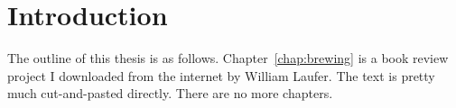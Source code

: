 %
%

\chapter{Introduction}

The outline of this thesis is as follows. Chapter~\ref{chap:brewing} is
a book review project I downloaded from the internet by William Laufer. The
text is pretty much cut-and-pasted directly. There are no more chapters.
